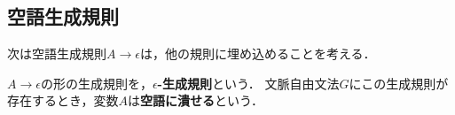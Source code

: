 \documentclass[uplatex, dvipdfmx]{jsreport}
\begin{document}
\subsection{空語生成規則}

\begin{tcolorbox}[colframe=ForestGreen, colback=ForestGreen!10!white, breakable]
    次は空語生成規則$A\to\epsilon$は，他の規則に埋め込めることを考える．
\end{tcolorbox}

\begin{definition}
    $A\to\epsilon$の形の生成規則を，\textbf{$\epsilon$-生成規則}という．
    文脈自由文法$G$にこの生成規則が存在するとき，変数$A$は\textbf{空語に潰せる}という．
\end{definition}
\end{document}
